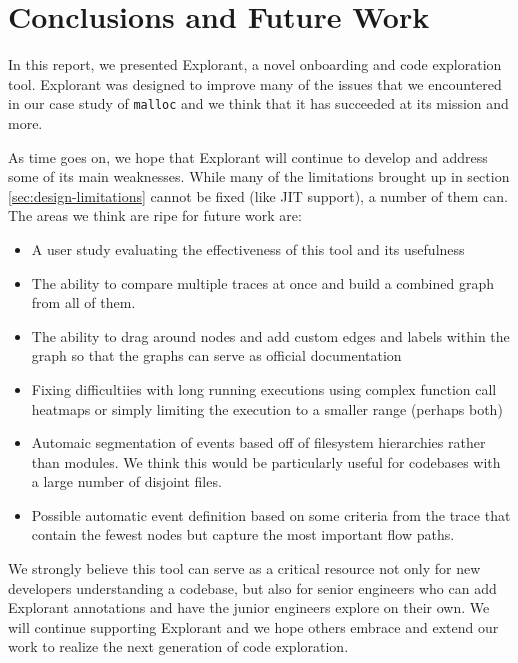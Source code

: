 \chapter{Conclusions and Future Work}
In this report, we presented Explorant, a novel onboarding and code exploration tool. Explorant was designed to improve many of the issues that we encountered in our case study of \texttt{malloc} and we think that it has succeeded at its mission and more. 

As time goes on, we hope that Explorant will continue to develop and address some of its main weaknesses. While many of the limitations brought up in section \ref{sec:design-limitations} cannot be fixed (like JIT support), a number of them can. The areas we think are ripe for future work are:
\begin{itemize}
    \item A user study evaluating the effectiveness of this tool and its usefulness
\item The ability to compare multiple traces at once and build a combined graph from all of them.
\item The ability to drag around nodes and add custom edges and labels within the graph so that the graphs can serve as official documentation
\item Fixing difficultiies with long running executions using complex function call heatmaps or simply limiting the execution to a smaller range (perhaps both) 
\item Automaic segmentation of events based off of filesystem hierarchies rather than modules. We think this would be particularly useful for codebases with a large number of disjoint files.
\item Possible automatic event definition based on some criteria from the trace that contain the fewest nodes but capture the most important flow paths. 
\end{itemize}

We strongly believe this tool can serve as a critical resource not only for new developers understanding a codebase, but also for senior engineers who can add Explorant annotations and have the junior engineers explore on their own. We will continue supporting Explorant and we hope others embrace and extend our work to realize the next generation of code exploration.

